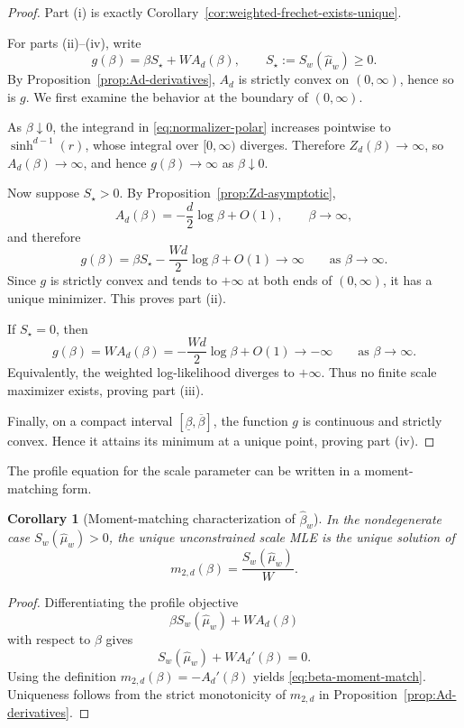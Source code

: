 \documentclass[11pt]{article}
\newtheorem{corollary}[theorem]{Corollary}
\begin{document}
\begin{proof}
Part (i) is exactly Corollary~\ref{cor:weighted-frechet-exists-unique}.

For parts (ii)--(iv), write
\[
g(\beta)
=
\beta S_\star + W A_d(\beta),
\qquad
S_\star:=S_w(\hat{\mu}_w)\ge 0.
\]
By Proposition~\ref{prop:Ad-derivatives}, \(A_d\) is strictly convex on \((0,\infty)\), hence so is \(g\). We first examine the behavior at the boundary of \((0,\infty)\).

As \(\beta\downarrow 0\), the integrand in \eqref{eq:normalizer-polar} increases pointwise to \(\sinh^{d-1}(r)\), whose integral over \([0,\infty)\) diverges. Therefore \(Z_d(\beta)\to\infty\), so \(A_d(\beta)\to\infty\), and hence \(g(\beta)\to\infty\) as \(\beta\downarrow 0\).

Now suppose \(S_\star>0\). By Proposition~\ref{prop:Zd-asymptotic},
\[
A_d(\beta)
=
-\frac{d}{2}\log\beta+O(1),
\qquad \beta\to\infty,
\]
and therefore
\[
g(\beta)
=
\beta S_\star-\frac{Wd}{2}\log\beta+O(1)
\to\infty
\qquad\text{as }\beta\to\infty.
\]
Since \(g\) is strictly convex and tends to \(+\infty\) at both ends of \((0,\infty)\), it has a unique minimizer. This proves part (ii).

If \(S_\star=0\), then
\[
g(\beta)=W A_d(\beta)
=
-\frac{Wd}{2}\log\beta+O(1)
\to -\infty
\qquad\text{as }\beta\to\infty.
\]
Equivalently, the weighted log-likelihood diverges to \(+\infty\). Thus no finite scale maximizer exists, proving part (iii).

Finally, on a compact interval \([\underline{\beta},\overline{\beta}]\), the function \(g\) is continuous and strictly convex. Hence it attains its minimum at a unique point, proving part (iv).
\end{proof}

The profile equation for the scale parameter can be written in a moment-matching form.

\begin{corollary}[Moment-matching characterization of \(\hat{\beta}_w\)]\label{cor:beta-moment-match}
In the nondegenerate case \(S_w(\hat{\mu}_w)>0\), the unique unconstrained scale MLE is the unique solution of
\begin{equation}\label{eq:beta-moment-match}
m_{2,d}(\beta)=\frac{S_w(\hat{\mu}_w)}{W}.
\end{equation}
\end{corollary}

\begin{proof}
Differentiating the profile objective
\[
\beta S_w(\hat{\mu}_w)+W A_d(\beta)
\]
with respect to \(\beta\) gives
\[
S_w(\hat{\mu}_w)+W A_d'(\beta)=0.
\]
Using the definition \(m_{2,d}(\beta)=-A_d'(\beta)\) yields \eqref{eq:beta-moment-match}. Uniqueness follows from the strict monotonicity of \(m_{2,d}\) in Proposition~\ref{prop:Ad-derivatives}.
\end{proof}
\end{document}
